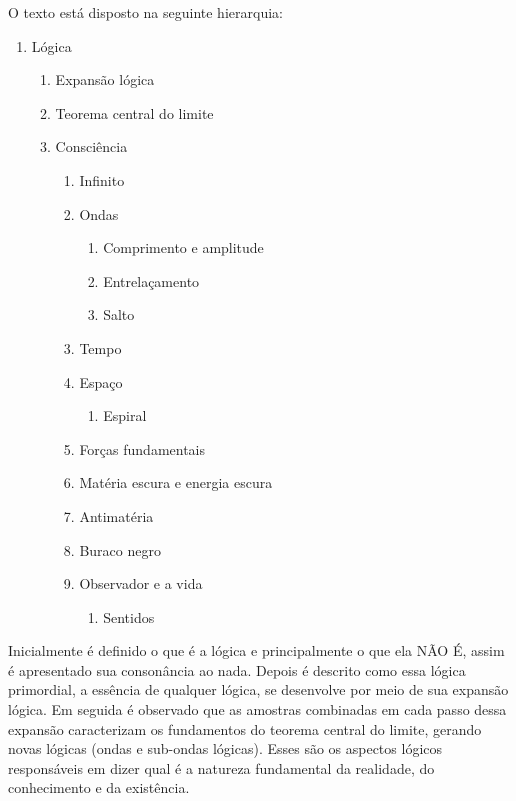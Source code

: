 \noindent O texto está disposto na seguinte hierarquia:
	\begin{enumerate}[label*=\arabic*.]
	   \item Lógica
	   \begin{enumerate}[label*=\arabic*.]
		   \item Expansão lógica
		   \item Teorema central do limite
		   \item Consciência
			   \begin{enumerate}[label*=\arabic*.]
				   \item Infinito
				   \item Ondas 
				   \begin{enumerate}[label*=\arabic*.]
				   		\item Comprimento e amplitude
				   		\item Entrelaçamento
				   		\item Salto
				   \end{enumerate}  
				   \item Tempo
				   \item Espaço
				   \begin{enumerate}[label*=\arabic*.]
				   		\item Espiral
				   \end{enumerate} 
				   \item Forças fundamentais
				   \item Matéria escura e energia escura
				   \item Antimatéria
				   \item Buraco negro
				   \item Observador e a vida
				   \begin{enumerate}[label*=\arabic*.]
				   		\item Sentidos
				   \end{enumerate}  
			   \end{enumerate}   
	   \end{enumerate}
	\end{enumerate}

Inicialmente é definido o que é a lógica e principalmente o que ela NÃO É, assim é apresentado sua consonância ao nada. Depois é descrito como essa lógica primordial, a essência de qualquer lógica, se desenvolve por meio de sua expansão lógica. Em seguida é observado que as amostras combinadas em cada passo dessa expansão caracterizam os fundamentos do teorema central do limite, gerando novas lógicas (ondas e sub-ondas lógicas). Esses são os aspectos lógicos responsáveis em dizer qual é a natureza fundamental da realidade, do conhecimento e da existência. 

\bigbreak